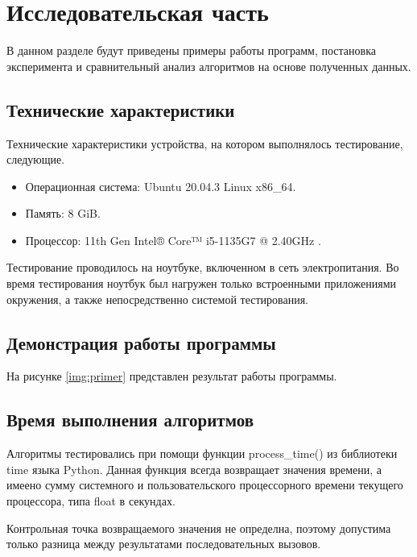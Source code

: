 \chapter{Исследовательская часть}

В данном разделе будут приведены примеры работы программ, постановка эксперимента и сравнительный анализ алгоритмов на основе полученных данных.

\section{Технические характеристики}

Технические характеристики устройства, на котором выполнялось тестирование, следующие.

\begin{itemize}
	\item Операционная система: Ubuntu 20.04.3 \cite{ubuntu} Linux \cite{linux} x86\_64.
	\item Память: 8 GiB.
	\item Процессор: 11th Gen Intel® Core™ i5-1135G7 @ 2.40GHz \cite{intel}.
\end{itemize}

Тестирование проводилось на ноутбуке, включенном в сеть электропитания. Во время тестирования ноутбук был нагружен только встроенными приложениями окружения, а также непосредственно системой тестирования.

\section{Демонстрация работы программы}

На рисунке \ref{img:primer} представлен результат работы программы.


\section{Время выполнения алгоритмов}

Алгоритмы тестировались при помощи функции process\_time() из библиотеки time языка Python. Данная функция всегда возвращает значения времени, а имеено сумму системного и пользовательского процессорного времени текущего процессора, типа float в секундах.

Контрольная точка возвращаемого значения не определна, поэтому допустима только разница между результатами последовательных вызовов.

